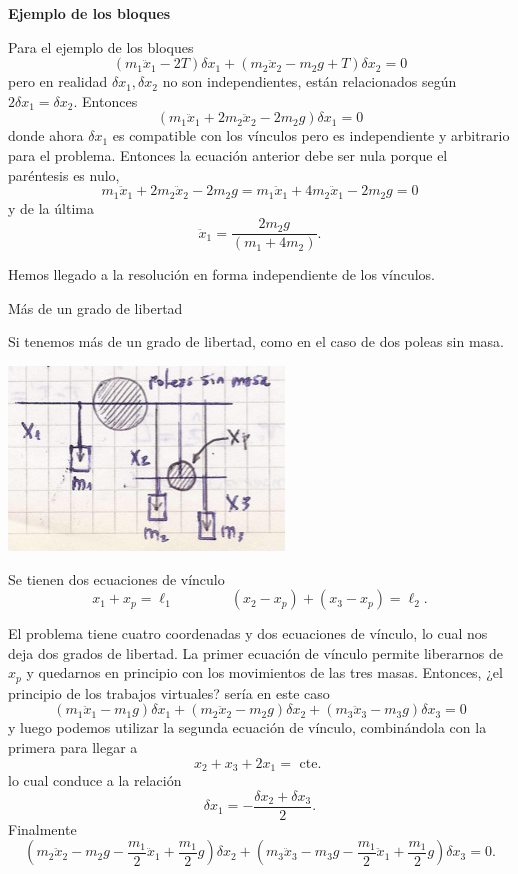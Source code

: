 \documentclass[10pt,oneside]{CBFT_book}
\begin{document}
\begin{ejemplo}{\bf Ejemplo de los bloques}

Para el ejemplo de los bloques
\[
	( m_1 \ddot{x}_1 - 2T )\delta x_1 + ( m_2 \ddot{x}_2 - m_2 g + T) \delta x_2 = 0
\]
pero en realidad $\delta x_1, \delta x_2$ no son independientes, están relacionados según $2\delta x_1 = \delta x_2$.
Entonces
\[
	( m_1 \ddot{x}_1 + 2 m_2 \ddot{x}_2 - 2 m_2 g )\delta x_1 = 0
\]
donde ahora $\delta x_1$ es compatible con los vínculos pero es independiente y arbitrario para el problema.
Entonces la ecuación anterior debe ser nula porque el paréntesis es nulo,
\[
	m_1 \ddot{x}_1 + 2 m_2 \ddot{x}_2 - 2 m_2 g = m_1 \ddot{x}_1 + 4 m_2 \ddot{x}_1 - 2 m_2 g = 0
\]
y de la última 
\[
	\ddot{x}_1 = \frac{2 m_2 g}{ (m_1 + 4m_2 ) }.
\]

Hemos llegado a la resolución en forma independiente de los vínculos.
\end{ejemplo}

\begin{ejemplo}{Más de un grado de libertad}

Si tenemos más de un grado de libertad, como en el caso de dos poleas sin masa.

\includegraphics[scale=0.4]{images/fig_mc_dos_poleas.jpg}

Se tienen dos ecuaciones de vínculo
\[
	x_1 + x_p = \ell_1 \qquad \qquad (x_2 -x_p)+(x_3 -x_p) = \ell_2.
\]

El problema tiene cuatro coordenadas y dos ecuaciones de vínculo, lo cual nos deja dos grados de libertad.
La primer ecuación de vínculo permite liberarnos de $x_p$ y quedarnos en principio con los movimientos de
las tres masas. Entonces, ¿el principio de los trabajos virtuales? sería en este caso 
\[
	( m_1 \ddot{x}_1 - m_1 g )\delta x_1 + ( m_2 \ddot{x}_2 - m_2 g )\delta x_2 + ( m_3 \ddot{x}_3 - m_3 g )\delta x_3 = 0
\]
y luego podemos utilizar la segunda ecuación de vínculo, combinándola con la primera para llegar a 
\[
	x_2 + x_3 + 2x_1 = \text{ cte. }
\]
lo cual conduce a la relación 
\[
	\delta x_1 = -\frac{ \delta x_2 + \delta x_3 }{2}.
\]
Finalmente
\[
	( m_2 \ddot{x}_2 - m_2 g -\frac{m_1}{2} \ddot{x}_1 + \frac{m_1}{2} g ) \delta x_2 + 
	( m_3 \ddot{x}_3 - m_3 g -\frac{m_1}{2} \ddot{x}_1 + \frac{m_1}{2} g ) \delta x_3 = 0.
\]
\end{ejemplo}
\end{document}
